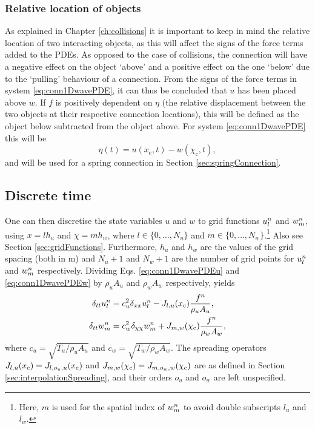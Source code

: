 \subsubsection{Relative location of objects}
As explained in Chapter \ref{ch:collisions} it is important to keep in mind the relative location of two interacting objects, as this will affect the signs of the force terms added to the PDEs. As opposed to the case of collisions, the connection will have a negative effect on the object `above' and a positive effect on the one `below' due to the `pulling' behaviour of a connection.
From the signs of the force terms in system \eqref{eq:conn1DwavePDE}, it can thus be concluded that $u$ has been placed above $w$. If $f$ is positively dependent on $\eta$ (the relative displacement between the two objects at their respective connection locations), this will be defined as the object below subtracted from the object above. For system \eqref{eq:conn1DwavePDE} this will be
\begin{equation}
    \eta(t) = u(x_\text{c}, t) - w(\chi_\text{c}, t),
\end{equation}
and will be used for a spring connection in Section \ref{sec:springConnection}.

\subsection{Discrete time}
One can then discretise the state variables $u$ and $w$ to grid functions $u_l^n$ and $w_m^n$, using $x = lh_u$ and $\chi = mh_w$, where $l\in \{0, \hdots, N_u\}$ and $m\in \{0, \hdots, N_w\}$.\footnote{Here, $m$ is used for the spatial index of $w_m^n$ to avoid double subscripts $l_u$ and $l_w$.} Also see Section \ref{sec:gridFunctions}. Furthermore, $h_u$ and $h_w$ are the values of the grid spacing (both in m) and $N_u+1$ and $N_w+1$ are the number of grid points for $u_l^n$ and $w_m^n$ respectively. Dividing Eqs. \eqref{eq:conn1DwavePDEu} and \eqref{eq:conn1DwavePDEw} by $\rho_u A_u$ and $\rho_w A_w$ respectively, yields
\begin{subequations}\label{eq:conn1DwaveFDS}
    \begin{align}
        \delta_{tt} u_l^n &= c_u^2 \delta_{xx} u_l^n -J_{l, u}(x_{\text{c}})\frac{f^n}{\rho_u A_u}, \label{eq:conn1DwaveFDSu} \\
        \delta_{tt} w_m^n &= c_w^2 \delta_{\chi\chi} w_m^n + J_{m, w}(\chi_{\text{c}})\frac{f^n}{\rho_w A_w},\label{eq:conn1DwaveFDSw}
    \end{align}
\end{subequations}
where $c_u = \sqrt{T_u / \rho_uA_u}$ and $c_w = \sqrt{T_w / \rho_wA_w}$. The spreading operators $J_{l, u}(x_{\text{c}}) = J_{l, o_u, u}(x_{\text{c}})$ and $J_{m, w}(\chi_{\text{c}}) = J_{m, o_w, w}(\chi_{\text{c}})$ are as defined in Section \ref{sec:interpolationSpreading}, and their orders $o_u$ and $o_w$ are left unspecified.

